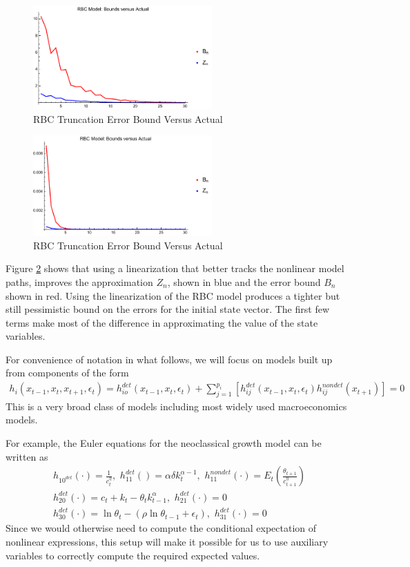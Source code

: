 \documentclass[12pt]{article}
\begin{document}
\begin{figure}
  \centering
\includegraphics[width=2.7in]{simpArbBoundsVActual.pdf}  
  \caption{RBC Truncation Error Bound Versus Actual}
  \label{rbcTrunc}
\end{figure}
\begin{figure}
  \centering
\includegraphics[width=2.7in]{simpBoundsVActual.pdf}  
  \caption{RBC Truncation Error Bound Versus Actual}
  \label{rbcTruncSimp}
\end{figure}



Figure \ref{rbcTruncSimp} shows that using a 
linearization that better tracks the 
nonlinear model paths, improves the approximation $Z_n$, shown in blue  and the error bound $B_n$ shown in red.
Using the linearization of the RBC model produces a tighter but still pessimistic bound on the errors for the initial state vector.
The first few terms make most of the difference in approximating the value of the state variables.




For convenience of notation in what follows, 
we will focus on models built up from components of the form
\begin{gather}
  h_i(x_{t-1},x_{t},x_{t+1},\epsilon_t)=h^{det}_{io}(x_{t-1},x_{t},\epsilon_t)+\sum_{j=1}^{p_i} [h^{det}_{ij}(x_{t-1},x_{t},\epsilon_t)h^{nondet}_{ij}(x_{t+1})]=0
\end{gather}
This is a very broad class of models including most widely used
macroeconomics models.

For example, the Euler equations for the  neoclassical growth  model 
\label{sec:simple-rbc-model-ext} can be written as
\begin{gather}
h_{10^{det}}(\cdot)=\frac{1}{c_t^\eta},\,\,
h_{11}^{det}()=\alpha \delta k_{t}^{\alpha-1} ,\,\,
h_{11}^{nondet}(\cdot)=E_t \left (\frac{\theta_{t+1}}{c_{t+1}^\eta} \right )\\
h_{20}^{det}(\cdot)=c_t + k_t-\theta_tk_{t-1}^\alpha,\,\,
h_{21}^{det}(\cdot)=0\\
h_{30}^{det}(\cdot)=\ln \theta_t -(\rho \ln \theta_{t-1} + \epsilon_t),\,\,
h_{31}^{det}(\cdot)=0
\end{gather}
Since we would otherwise  need to compute 
the conditional expectation of nonlinear expressions,  
this setup will make it possible for us to use auxiliary
variables to correctly compute the required expected values.
\end{document}
